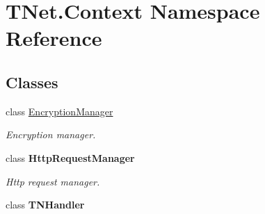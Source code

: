 \hypertarget{namespace_t_net_1_1_context}{}\section{T\+Net.\+Context Namespace Reference}
\label{namespace_t_net_1_1_context}
\subsection*{Classes}
\begin{DoxyCompactItemize}
\item 
class \mbox{\hyperlink{class_t_net_1_1_context_1_1_encryption_manager}{Encryption\+Manager}}
\begin{DoxyCompactList}\small\item\em Encryption manager. \end{DoxyCompactList}\item 
class {\bfseries Http\+Request\+Manager}
\begin{DoxyCompactList}\small\item\em Http request manager. \end{DoxyCompactList}\item 
class {\bfseries T\+N\+Handler}
\end{DoxyCompactItemize}

